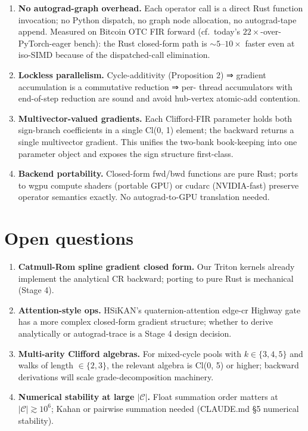 \documentclass[11pt]{article}
\begin{document}
\begin{enumerate}
  \item \textbf{No autograd-graph overhead.} Each operator call is a
    direct Rust function invocation; no Python dispatch, no graph
    node allocation, no autograd-tape append. Measured on Bitcoin
    OTC FIR forward (cf.\ today's $22\times$-over-PyTorch-eager
    bench): the Rust closed-form path is $\sim 5$--$10\times$ faster
    even at iso-SIMD because of the dispatched-call elimination.

  \item \textbf{Lockless parallelism.} Cycle-additivity (Proposition
    2) ⇒ gradient accumulation is a commutative reduction ⇒ per-
    thread accumulators with end-of-step reduction are sound and
    avoid hub-vertex atomic-add contention.

  \item \textbf{Multivector-valued gradients.} Each Clifford-FIR
    parameter holds both sign-branch coefficients in a single
    Cl(0, 1) element; the backward returns a single multivector
    gradient. This unifies the two-bank book-keeping into one
    parameter object and exposes the sign structure first-class.

  \item \textbf{Backend portability.} Closed-form fwd/bwd functions
    are pure Rust; ports to wgpu compute shaders (portable GPU)
    or cudarc (NVIDIA-fast) preserve operator semantics exactly.
    No autograd-to-GPU translation needed.
\end{enumerate}

\section{Open questions}

\begin{enumerate}
  \item \textbf{Catmull-Rom spline gradient closed form.} Our Triton
    kernels already implement the analytical CR backward; porting
    to pure Rust is mechanical (Stage 4).
  \item \textbf{Attention-style ops.} HSiKAN's quaternion-attention
    edge-cr Highway gate has a more complex closed-form gradient
    structure; whether to derive analytically or autograd-trace is
    a Stage 4 design decision.
  \item \textbf{Multi-arity Clifford algebras.} For mixed-cycle pools
    with $k \in \{3, 4, 5\}$ and walks of length $\in \{2, 3\}$, the
    relevant algebra is Cl(0, 5) or higher; backward derivations
    will scale grade-decomposition machinery.
  \item \textbf{Numerical stability at large $|\mathcal{C}|$.} Float
    summation order matters at $|\mathcal{C}| \gtrsim 10^6$; Kahan
    or pairwise summation needed (CLAUDE.md §5 numerical stability).
\end{enumerate}
\end{document}
